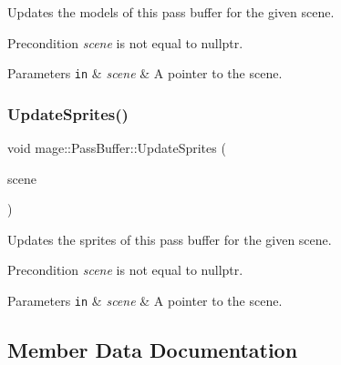 Updates the models of this pass buffer for the given scene.

\begin{DoxyPrecond}{Precondition}
{\itshape scene} is not equal to {\ttfamily nullptr}. 
\end{DoxyPrecond}

\begin{DoxyParams}[1]{Parameters}
\mbox{\tt in}  & {\em scene} & A pointer to the scene. \\
\hline
\end{DoxyParams}
\hypertarget{structmage_1_1_pass_buffer_a8301fd646965c627f29120f412078ca1}{}\label{structmage_1_1_pass_buffer_a8301fd646965c627f29120f412078ca1} 
\subsubsection{\texorpdfstring{Update\+Sprites()}{UpdateSprites()}}
{\footnotesize\ttfamily void mage\+::\+Pass\+Buffer\+::\+Update\+Sprites (\begin{DoxyParamCaption}\item[{const \hyperlink{classmage_1_1_scene}{Scene} $\ast$}]{scene }\end{DoxyParamCaption})\hspace{0.3cm}{\ttfamily [private]}}

Updates the sprites of this pass buffer for the given scene.

\begin{DoxyPrecond}{Precondition}
{\itshape scene} is not equal to {\ttfamily nullptr}. 
\end{DoxyPrecond}

\begin{DoxyParams}[1]{Parameters}
\mbox{\tt in}  & {\em scene} & A pointer to the scene. \\
\hline
\end{DoxyParams}


\subsection{Member Data Documentation}
\hypertarget{structmage_1_1_pass_buffer_a311ad723470aff0ad80c325d9ead07b9}{}\label{structmage_1_1_pass_buffer_a311ad723470aff0ad80c325d9ead07b9} 
